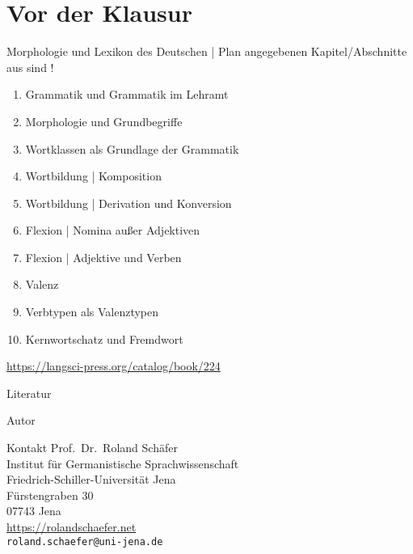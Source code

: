 \documentclass[handout,aspectratio=1610,dvipsnames]{beamer}
\begin{document}
  \section{Vor der Klausur}

  \begin{frame}
    {Morphologie und Lexikon des Deutschen | Plan}
     angegebenen Kapitel\slash Abschnitte aus  sind !\\
    \Halbzeile
    \begin{enumerate}
      \item Grammatik und Grammatik im Lehramt 
      \item Morphologie und Grundbegriffe 
      \item Wortklassen als Grundlage der Grammatik 
      \item Wortbildung | Komposition 
      \item Wortbildung | Derivation und Konversion 
      \item Flexion | Nomina außer Adjektiven 
      \item Flexion | Adjektive und Verben 
      \item Valenz 
      \item Verbtypen als Valenztypen 
      \item Kernwortschatz und Fremdwort 
    \end{enumerate}
    \Halbzeile
    \centering 
    \url{https://langsci-press.org/catalog/book/224}
  \end{frame}

\fi

\makeatletter
\setcounter{lastpagemainpart}{\the\c@framenumber}
\makeatother

\appendix

\begin{frame}[allowframebreaks]
  {Literatur}
  \renewcommand*{\bibfont}{\footnotesize}
  \printbibliography
\end{frame}

\begin{frame}
  {Autor}
  \begin{block}{Kontakt}
    Prof.\ Dr.\ Roland Schäfer\\
    Institut für Germanistische Sprachwissenschaft\\
    Friedrich-Schiller-Universität Jena\\
    Fürstengraben 30\\
    07743 Jena\\[\baselineskip]
    \url{https://rolandschaefer.net}\\
    \texttt{roland.schaefer@uni-jena.de}
  \end{block}
\end{frame}
\end{document}
